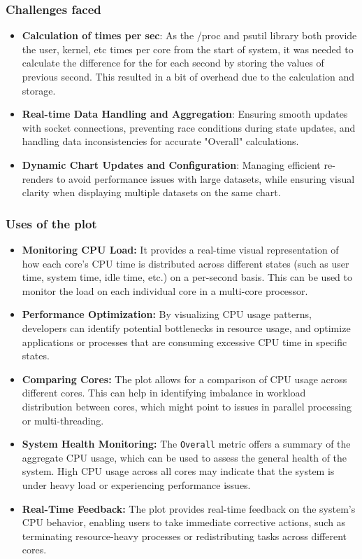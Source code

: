 \documentclass[12pt]{article}
\begin{document}
\subsubsection{Challenges faced}
    \begin{itemize}
    \item \textbf{Calculation of times per sec}: As the /proc and psutil library both provide the user, kernel, etc times per core from the start of system, it was needed to calculate the difference for the for each second by storing the values of previous second. This resulted in a bit of overhead due to the calculation and storage.
    \item \textbf{Real-time Data Handling and Aggregation}: Ensuring smooth updates with socket connections, preventing race conditions during state updates, and handling data inconsistencies for accurate "Overall" calculations.
    \item \textbf{Dynamic Chart Updates and Configuration}: Managing efficient re-renders to avoid performance issues with large datasets, while ensuring visual clarity when displaying multiple datasets on the same chart.
\end{itemize}

\subsubsection{Uses of the plot}
\begin{itemize}
    \item \textbf{Monitoring CPU Load:} It provides a real-time visual representation of how each core's CPU time is distributed across different states (such as user time, system time, idle time, etc.) on a per-second basis. This can be used to monitor the load on each individual core in a multi-core processor.
    \item \textbf{Performance Optimization:} By visualizing CPU usage patterns, developers can identify potential bottlenecks in resource usage, and optimize applications or processes that are consuming excessive CPU time in specific states.
    \item \textbf{Comparing Cores:} The plot allows for a comparison of CPU usage across different cores. This can help in identifying imbalance in workload distribution between cores, which might point to issues in parallel processing or multi-threading.
    \item \textbf{System Health Monitoring:} The \texttt{Overall} metric offers a summary of the aggregate CPU usage, which can be used to assess the general health of the system. High CPU usage across all cores may indicate that the system is under heavy load or experiencing performance issues.
    \item \textbf{Real-Time Feedback:} The plot provides real-time feedback on the system's CPU behavior, enabling users to take immediate corrective actions, such as terminating resource-heavy processes or redistributing tasks across different cores.
\end{itemize}
\end{document}
